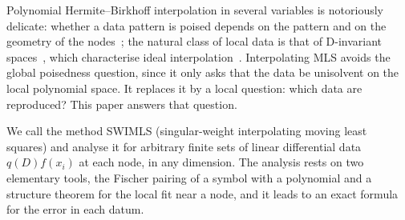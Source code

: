 \documentclass[12pt]{amsart}
\theoremstyle{definition}
\theoremstyle{remark}
\begin{document}
Polynomial Hermite--Birkhoff interpolation in several variables is notoriously delicate: whether
a data pattern is poised depends on the pattern and on the geometry of the
nodes~\cite{LorentzJetterRiemenschneider1983,GascaSauer2000,Lorentz2000}; the natural class
of local data is that of D-invariant spaces~\cite{deBoorRon1990,SauerXu1995}, which
characterise ideal interpolation~\cite{deBoor2005,Shekhtman2010}.
Interpolating MLS avoids the global poisedness question, since it only asks that the data be unisolvent on the local
polynomial space. It replaces it by a local question: which data are reproduced? This paper
answers that question.

We call the method SWIMLS (singular-weight interpolating moving least squares) and analyse it
for arbitrary finite sets of linear differential data $q(D)f(x_i)$ at each node, in any
dimension. The analysis rests on two elementary tools, the Fischer pairing of a symbol with a
polynomial and a structure theorem for the local fit near a node, and it leads to an exact
formula for the error in each datum.
\end{document}
